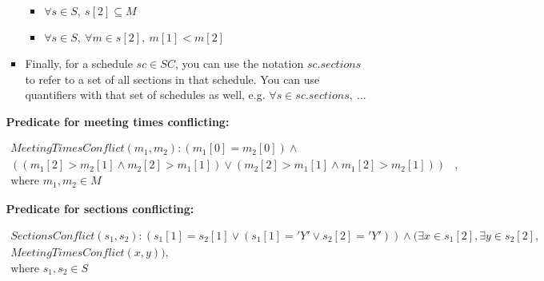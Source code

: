 \documentclass[fontsize=11pt]{article}
\begin{document}
\begin{enumerate}
\begin{enumerate}
\begin{itemize}
                          \begin{itemize}
                              \item $\forall s \in S,~ s[2] \subseteq M$
                              \item $\forall s \in S,~ \forall m \in s[2],~ m[1] < m[2]$
                          \end{itemize}

                    \item
                          Finally, for a schedule $sc \in SC$, you can use the notation $sc.sections$ to refer to a set of all sections in that schedule.
                          You can use quantifiers with that set of schedules as well, e.g.
                          $\forall s \in sc.sections,~ ...$
                \end{itemize}

                \textbf{Predicate for meeting times conflicting:}


                \begin{align*}
                    MeetingTimesConflict(m_1, m_2) : (m_1[0] = m_2[0]) \land                               &   \\
                    ((m_1[2] > m_2[1] \land m_2[2] > m_1[1]) \lor (m_2[2] > m_1[1] \land m_1[2] > m_2[1])) & , \\
                    \text{where $m_1, m_2 \in M$}                                                          &
                \end{align*}

                \smallskip

                \textbf{Predicate for sections conflicting:}


                \begin{align*}
                    SectionsConflict(s_1, s_2) : (s_1[1] = s_2[1] \lor (s_1[1] = 'Y' \lor s_2[2] = 'Y')) \land (\exists x \in s_1[2], \exists y \in s_2[2], & \\
                    MeetingTimesConflict(x, y)),                                                                                                                        & \\
                    \text{where $s_1, s_2 \in S$}                                                                                                                       &
                \end{align*}

                \smallskip


\end{enumerate}
\end{enumerate}
\end{document}
